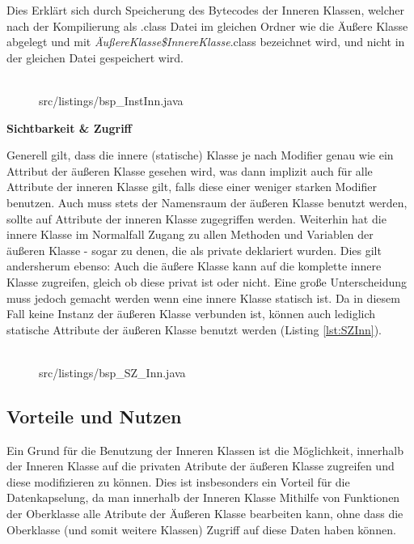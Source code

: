 Dies Erklärt sich durch Speicherung des Bytecodes der Inneren Klassen, welcher nach der Kompilierung als .class Datei im gleichen Ordner wie die Äußere Klasse abgelegt und mit {\it ÄußereKlasse\$InnereKlasse}.class bezeichnet wird, und nicht in der gleichen Datei gespeichert wird.
\\
\\
\begin{figure}[hbt]
\lstset{language=Java}
 {src/listings/bsp_InstInn.java}
\end{figure}

\newpage

{\bf Sichtbarkeit \& Zugriff}

Generell gilt, dass die innere (statische) Klasse je nach Modifier genau wie ein Attribut der äußeren Klasse gesehen wird, was dann implizit auch für alle Attribute der inneren Klasse gilt, falls diese einer weniger starken Modifier benutzen.
Auch muss stets der Namensraum der äußeren Klasse benutzt werden, sollte auf Attribute der inneren Klasse zugegriffen werden.
Weiterhin hat die innere Klasse im Normalfall Zugang zu allen Methoden und Variablen der äußeren Klasse - sogar zu denen, die als private deklariert wurden.
Dies gilt andersherum ebenso: Auch die äußere Klasse kann auf die komplette innere Klasse zugreifen, gleich ob diese privat ist oder nicht.
Eine große Unterscheidung muss jedoch gemacht werden wenn eine innere Klasse statisch ist. Da in diesem Fall keine Instanz der äußeren Klasse verbunden ist, können auch lediglich statische Attribute der äußeren Klasse benutzt werden (Listing \ref{lst:SZInn}).
\\
\\
\begin{figure}[hbt]
\lstset{language=Java}
 {src/listings/bsp_SZ_Inn.java}
\end{figure}

\newpage

\subsection{Vorteile und Nutzen}

Ein Grund für die Benutzung der Inneren Klassen ist die Möglichkeit, innerhalb der Inneren Klasse auf die privaten Atribute der äußeren Klasse zugreifen und diese modifizieren zu können.
Dies ist insbesonders ein Vorteil für die Datenkapselung, da man innerhalb der Inneren Klasse Mithilfe von Funktionen der Oberklasse alle Atribute der Äußeren Klasse bearbeiten kann, ohne dass die Oberklasse (und somit weitere Klassen) Zugriff auf diese Daten haben können.

